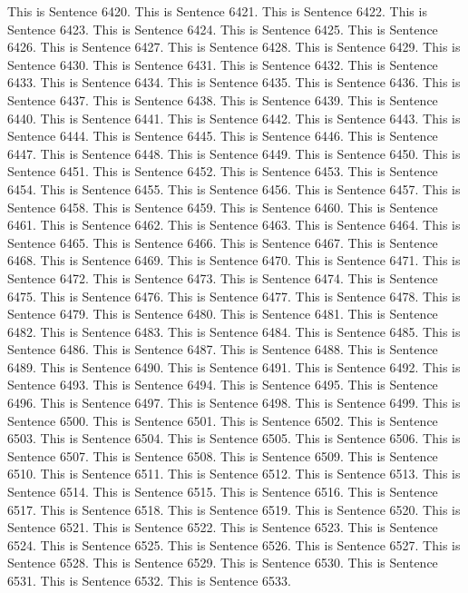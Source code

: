 \documentclass{article}
\begin{document}
This is Sentence 6420.
This is Sentence 6421.
This is Sentence 6422.
This is Sentence 6423.
This is Sentence 6424.
This is Sentence 6425.
This is Sentence 6426.
This is Sentence 6427.
This is Sentence 6428.
This is Sentence 6429.
This is Sentence 6430.
This is Sentence 6431.
This is Sentence 6432.
This is Sentence 6433.
This is Sentence 6434.
This is Sentence 6435.
This is Sentence 6436.
This is Sentence 6437.
This is Sentence 6438.
This is Sentence 6439.
This is Sentence 6440.
This is Sentence 6441.
This is Sentence 6442.
This is Sentence 6443.
This is Sentence 6444.
This is Sentence 6445.
This is Sentence 6446.
This is Sentence 6447.
This is Sentence 6448.
This is Sentence 6449.
This is Sentence 6450.
This is Sentence 6451.
This is Sentence 6452.
This is Sentence 6453.
This is Sentence 6454.
This is Sentence 6455.
This is Sentence 6456.
This is Sentence 6457.
This is Sentence 6458.
This is Sentence 6459.
This is Sentence 6460.
This is Sentence 6461.
This is Sentence 6462.
This is Sentence 6463.
This is Sentence 6464.
This is Sentence 6465.
This is Sentence 6466.
This is Sentence 6467.
This is Sentence 6468.
This is Sentence 6469.
This is Sentence 6470.
This is Sentence 6471.
This is Sentence 6472.
This is Sentence 6473.
This is Sentence 6474.
This is Sentence 6475.
This is Sentence 6476.
This is Sentence 6477.
This is Sentence 6478.
This is Sentence 6479.
This is Sentence 6480.
This is Sentence 6481.
This is Sentence 6482.
This is Sentence 6483.
This is Sentence 6484.
This is Sentence 6485.
This is Sentence 6486.
This is Sentence 6487.
This is Sentence 6488.
This is Sentence 6489.
This is Sentence 6490.
This is Sentence 6491.
This is Sentence 6492.
This is Sentence 6493.
This is Sentence 6494.
This is Sentence 6495.
This is Sentence 6496.
This is Sentence 6497.
This is Sentence 6498.
This is Sentence 6499.
This is Sentence 6500.
This is Sentence 6501.
This is Sentence 6502.
This is Sentence 6503.
This is Sentence 6504.
This is Sentence 6505.
This is Sentence 6506.
This is Sentence 6507.
This is Sentence 6508.
This is Sentence 6509.
This is Sentence 6510.
This is Sentence 6511.
This is Sentence 6512.
This is Sentence 6513.
This is Sentence 6514.
This is Sentence 6515.
This is Sentence 6516.
This is Sentence 6517.
This is Sentence 6518.
This is Sentence 6519.
This is Sentence 6520.
This is Sentence 6521.
This is Sentence 6522.
This is Sentence 6523.
This is Sentence 6524.
This is Sentence 6525.
This is Sentence 6526.
This is Sentence 6527.
This is Sentence 6528.
This is Sentence 6529.
This is Sentence 6530.
This is Sentence 6531.
This is Sentence 6532.
This is Sentence 6533.
\end{document}
